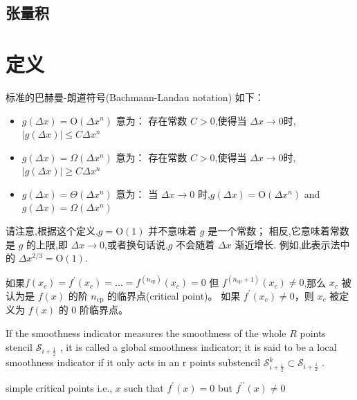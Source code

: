 \documentclass{book}
\begin{document}
\subsection{张量积}


\section{定义}
\begin{definition}
  标准的巴赫曼-朗道符号(Bachmann-Landau notation) 如下：

  \begin{itemize}
    \item $g(\Delta x)=\mathrm{O}\left(\Delta x^{n}\right)$  意为： 存在常数 $C>0$,使得当 $\Delta x \rightarrow 0$时,$|g(\Delta x)| \leq C \Delta x^{n}$
    \item $g(\Delta x)=\Omega\left(\Delta x^{n}\right)$ 意为：  存在常数 $C>0$,使得当 $\Delta x \rightarrow 0$时,$|g(\Delta x)| \geq C \Delta x^{n}$
    \item $g(\Delta x)=\Theta\left(\Delta x^{n}\right)$  意为： 当 $\Delta x \rightarrow 0$ 时,$g(\Delta x)=\mathrm{O}\left(\Delta x^{n}\right)$  and  $g(\Delta x)=\Omega\left(\Delta x^{n}\right)$
  \end{itemize}

  请注意,根据这个定义,$g=\mathrm{O}(1)$ 并不意味着 $g$ 是一个常数； 相反,它意味着常数是 $g$ 的上限,即 $\Delta x \rightarrow 0$,或者换句话说,$g$ 不会随着 $\Delta x$ 渐近增长. 例如,此表示法中的 $\Delta x^{2 / 3}=\mathrm{O}(1)$.
\end{definition}
\begin{definition}
  如果$f\left(x_{c}\right)=f^{\prime}\left(x_{c}\right)=\ldots=f^{\left(n_{\mathrm{cp}}\right) }\left(x_{c}\right)=0$ 但 $f^{\left(n_{\mathrm{cp}}+1\right)}\left(x_{c}\right) \neq 0$,那么 $x_{c}$ 被认为是 $f(x)$ 的阶 $n_{\mathrm{cp}}$ 的临界点(critical point)。 如果 $f^{\prime}\left(x_{c}\right) \neq 0$，则 $x_{c}$ 被定义为 $f(x)$ 的 0 阶临界点。
\end{definition}
\begin{definition}
  \cite{WENO-Z-2016}
  If the smoothness indicator measures the smoothness of the whole  $R$  points stencil  $\mathcal{S}_{i+\frac{1}{2}}$ , it is called a global smoothness indicator; it is said to be a local smoothness indicator if it only acts in an  r  points substencil  $\mathcal{S}_{i+\frac{1}{2}}^{k} \subset \mathcal{S}_{i+\frac{1}{2}}$ .
\end{definition}
\begin{definition}
  \cite{WENO-Z-2016}
  simple critical points i.e.,  $x$  such that  $f^{\prime}(x)=0$  but  $f^{\prime \prime}(x) \neq 0$
\end{definition}
\end{document}

